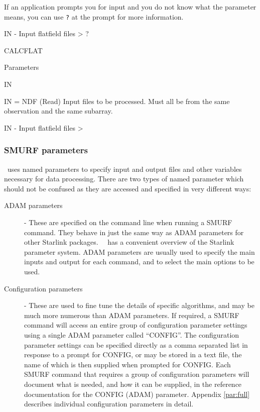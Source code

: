\documentclass[oneside,11pt]{starlink}
\begin{document}
\begin{terminalv}
\end{terminalv}

If an application prompts you for input and you do not know what the
parameter means, you can use \verb+?+ at the prompt for more
information.

\begin{terminalv}
IN - Input flatfield files > ?

CALCFLAT

  Parameters

    IN

      IN = NDF (Read)
         Input files to be processed. Must all be from the same
         observation and the same subarray.

IN - Input flatfield files >
\end{terminalv}

\subsubsection{SMURF parameters}

\SMURF\ uses named parameters to specify input and output files and
other variables necessary for data processing. There are two types of
named parameter which should not be confused as they are accessed and
specified in very different ways:

\begin{description}
\item[ADAM parameters] - These are specified on the command line when
running a SMURF command. They behave in just the same way as ADAM
parameters for other Starlink packages. \KAPPA\ \KAPPAref\ has a
convenient overview of the Starlink parameter system. ADAM parameters are
usually used to specify the main inputs and output for each command, and
to select the main options to be used.
\item[Configuration parameters] - These are used to fine tune the details
of specific algorithms, and may be much more numerous than ADAM
parameters. If required, a SMURF command will access an entire group of
configuration parameter settings using a single ADAM parameter called
``CONFIG''. The configuration parameter settings can be specified
directly as a comma separated list in response to a prompt for CONFIG, or
may be stored in a text file, the name of which is then supplied when
prompted for CONFIG. Each SMURF command that requires a group of
configuration parameters will document what is needed, and how it can be
supplied, in the reference documentation for the CONFIG (ADAM) parameter.
Appendix \ref{par:full} describes individual configuration parameters in
detail.
\end{description}
\end{document}
